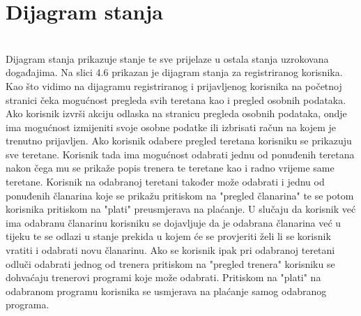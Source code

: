 		\eject
	
			\eject
		
		\section{Dijagram stanja}
			
			
			\textbf{}\\
			
			Dijagram stanja prikazuje stanje te sve prijelaze u ostala stanja uzrokovana događajima. Na slici 4.6 prikazan je dijagram stanja za registriranog korisnika. Kao što vidimo na dijagramu registriranog i prijavljenog korisnika na početnoj stranici čeka mogućnost pregleda svih teretana kao i pregled osobnih podataka. Ako korisnik izvrši akciju odlaska na stranicu pregleda osobnih podataka, ondje ima mogućnost izmijeniti svoje osobne podatke ili izbrisati račun na kojem je trenutno prijavljen. Ako korisnik odabere pregled teretana korisniku se prikazuju sve teretane. Korisnik tada ima mogućnost odabrati jednu od ponuđenih teretana nakon čega mu se prikaže popis trenera te teretane kao i radno vrijeme same teretane. Korisnik na odabranoj teretani također može odabrati i jednu od ponuđenih članarina koje se prikažu pritiskom na "pregled članarina" te se potom korisnika pritiskom na "plati" preusmjerava na plaćanje. U slučaju da korisnik već ima odabranu članarinu korisniku se dojavljuje da je odabrana članarina već u tijeku te se odlazi u stanje prekida u kojem će se provjeriti želi li se korisnik vratiti i odabrati novu članarinu. Ako se korisnik ipak pri odabranoj teretani odluči odabrati jednog od trenera pritiskom na "pregled trenera" korisniku se dohvaćaju trenerovi programi koje može odabrati. Pritiskom na "plati" na odabranom programu korisnika se usmjerava na plaćanje samog odabranog programa.
